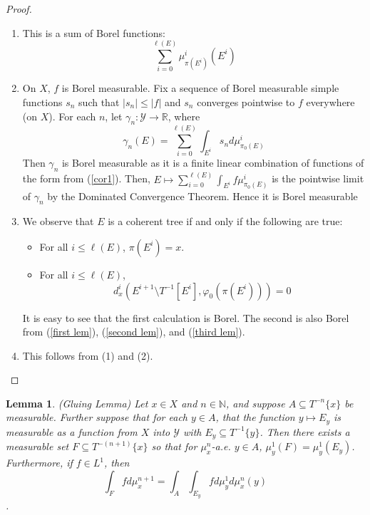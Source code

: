 \documentclass{article}
\newcommand{\N}{\mathbb{N}}
\newcommand{\abs}[1]{\left\vert#1\right\vert}
\let\oldref\ref
\renewcommand{\ref}[1]{(\oldref{#1})}
\newtheorem{lemma}[theorem]{Lemma}
\theoremstyle{definition}
\begin{document}
\begin{proof}
    \begin{enumerate}
        \item This is a sum of Borel functions: 
        \[
        \sum_{i=0}^{\ell(E)} \mu_{\pi(E^i)}^{i}(E^i) 
        \]
        \item On $ X $, $ f $ is Borel measurable. Fix a sequence of Borel measurable simple functions $ s_n $ such that $ \abs{s_n}\leq \abs{f} $ and $ s_n $ converges pointwise to $ f $ everywhere (on $ X $). For each $ n $, let $ \gamma_n:\mathcal{Y}\rightarrow \mathbb{R} $, where
        \[
        \gamma_n(E) = \sum_{i=0}^{\ell(E)} \int_{E^i} s_n d\mu_{\pi_0(E)}^i  
        \]
        Then $ \gamma_n $ is Borel measurable as it is a finite linear combination of functions of the form from \ref{cor1}. Then, $ E\mapsto \sum_{i=0}^{\ell(E)}\int_{E^i} f\mu_{\pi_0(E)}^i $ 
        is the pointwise limit of $ \gamma_n $ by the Dominated Convergence Theorem. Hence it is Borel measurable
        \item We observe that $ E $ is a coherent tree if and only if the following are true:
        \begin{itemize}
            \item For all $ i\leq \ell(E) $, $ \pi(E^i) = x $. 
            \item For all $ i \leq \ell(E) $, 
            \[
            d^i_x(E^{i+1}\setminus T^{-1}[E^i],\varphi_0(\pi(E^i))) = 0 
            \]
        \end{itemize}
        It is easy to see that the first calculation is Borel. The second is also Borel from \ref{first lem}, \ref{second lem}, and \ref{third lem}.
        \item This follows from (1) and (2).
    \end{enumerate}
\end{proof}
\begin{lemma}
    \label{gluing}(Gluing Lemma) Let $ x\in X $ and $ n\in \N $, and suppose $ A \subseteq T^{-n}\{x\} $ be measurable. Further suppose that for each $ y\in A $, that the function $ y\mapsto E_y $ is measurable as a function from $ X $ into $ \mathcal{Y} $ with $ E_y\subseteq T^{-1}\{y\} $. Then there exists a measurable set $ F\subseteq T^{-(n+1)}\{x\} $ so that for $ \mu_x^n $-a.e. $ y\in A $, $ \mu_y^1(F) = \mu_y^1(E_y) $. Furthermore, if $ f\in L^1 $, then 
    \[
    \int_{F} fd\mu_x^{n+1} = \int_A \int_{E_y} fd\mu_y^1d\mu_x^n(y)
    \].
\end{lemma}
\end{document}
